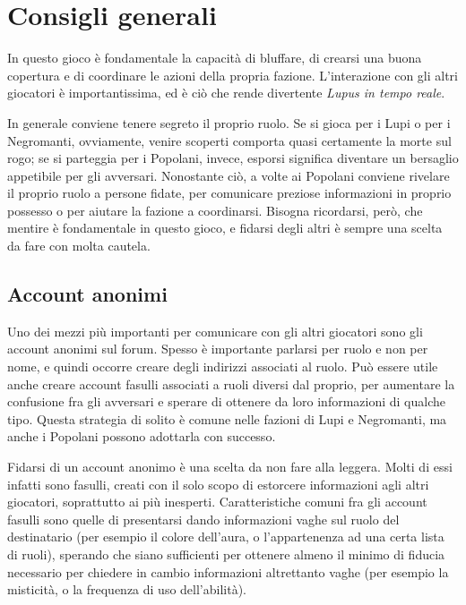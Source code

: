 \documentclass[a4paper,10pt]{article}
\begin{document}
\section{Consigli generali}

In questo gioco è fondamentale la capacità di bluffare, di crearsi una buona copertura e di coordinare le azioni della propria fazione. L'interazione con gli altri giocatori è importantissima, ed è ciò che rende divertente \emph{Lupus in tempo reale}.

In generale conviene tenere segreto il proprio ruolo. Se si gioca per i Lupi o per i Negromanti, ovviamente, venire scoperti comporta quasi certamente la morte sul rogo; se si parteggia per i Popolani, invece, esporsi significa diventare un bersaglio appetibile per gli avversari. Nonostante ciò, a volte ai Popolani conviene rivelare il proprio ruolo a persone fidate, per comunicare preziose informazioni in proprio possesso o per aiutare la fazione a coordinarsi. Bisogna ricordarsi, però, che mentire è fondamentale in questo gioco, e fidarsi degli altri è sempre una scelta da fare con molta cautela.

\subsection{Account anonimi}

Uno dei mezzi più importanti per comunicare con gli altri giocatori sono gli account anonimi sul forum. Spesso è importante parlarsi per ruolo e non per nome, e quindi occorre creare degli indirizzi associati al ruolo. Può essere utile anche creare account fasulli associati a ruoli diversi dal proprio, per aumentare la confusione fra gli avversari e sperare di ottenere da loro informazioni di qualche tipo. Questa strategia di solito è comune nelle fazioni di Lupi e Negromanti, ma anche i Popolani possono adottarla con successo.

Fidarsi di un account anonimo è una scelta da non fare alla leggera. Molti di essi infatti sono fasulli, creati con il solo scopo di estorcere informazioni agli altri giocatori, soprattutto ai più inesperti. Caratteristiche comuni fra gli account fasulli sono quelle di presentarsi dando informazioni vaghe sul ruolo del destinatario (per esempio il colore dell'aura, o l'appartenenza ad una certa lista di ruoli), sperando che siano sufficienti per ottenere almeno il minimo di fiducia necessario per chiedere in cambio informazioni altrettanto vaghe (per esempio la misticità, o la frequenza di uso dell'abilità).
\end{document}
